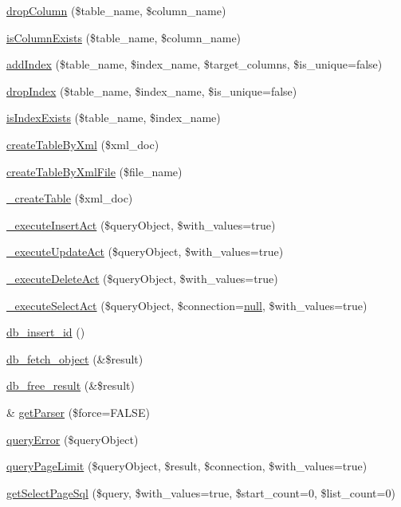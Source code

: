 \begin{DoxyCompactItemize}
\item 
\hyperlink{classDBMysql_aa4cd80d663225f3cd7a539d7d7101b38}{drop\+Column} (\$table\+\_\+name, \$column\+\_\+name)
\item 
\hyperlink{classDBMysql_a537be41db3f377b088353baa7be50a13}{is\+Column\+Exists} (\$table\+\_\+name, \$column\+\_\+name)
\item 
\hyperlink{classDBMysql_ae17d30f3fd2dbbc29996acdc8c36a00f}{add\+Index} (\$table\+\_\+name, \$index\+\_\+name, \$target\+\_\+columns, \$is\+\_\+unique=false)
\item 
\hyperlink{classDBMysql_a43937761dd37fa25ef0d373446d01d90}{drop\+Index} (\$table\+\_\+name, \$index\+\_\+name, \$is\+\_\+unique=false)
\item 
\hyperlink{classDBMysql_acabd46877d9ce2131b847696b1174382}{is\+Index\+Exists} (\$table\+\_\+name, \$index\+\_\+name)
\item 
\hyperlink{classDBMysql_a8d5c199f2a7362b92c7a6ba03ebdd554}{create\+Table\+By\+Xml} (\$xml\+\_\+doc)
\item 
\hyperlink{classDBMysql_a92f43909e6ba226fc7067ddc25594a33}{create\+Table\+By\+Xml\+File} (\$file\+\_\+name)
\item 
\hyperlink{classDBMysql_a7a3edda6d00b0c7b3702283b495b0a5d}{\+\_\+create\+Table} (\$xml\+\_\+doc)
\item 
\hyperlink{classDBMysql_a29a81acddeeaff54b404dec8377b2d2b}{\+\_\+execute\+Insert\+Act} (\$query\+Object, \$with\+\_\+values=true)
\item 
\hyperlink{classDBMysql_a93657e31e6a8f311aa76668602529e10}{\+\_\+execute\+Update\+Act} (\$query\+Object, \$with\+\_\+values=true)
\item 
\hyperlink{classDBMysql_aa1f3d836a8da807793983ff3f48998da}{\+\_\+execute\+Delete\+Act} (\$query\+Object, \$with\+\_\+values=true)
\item 
\hyperlink{classDBMysql_a2643d9c9b3e5d5286e956ea6fc883cc9}{\+\_\+execute\+Select\+Act} (\$query\+Object, \$connection=\hyperlink{modernizr_8min_8js_a286f9ec831c5e676eeb493248eab9575}{null}, \$with\+\_\+values=true)
\item 
\hyperlink{classDBMysql_a21acddd922e39574922f60b881add658}{db\+\_\+insert\+\_\+id} ()
\item 
\hyperlink{classDBMysql_a117189e72a44d1c3b615f133f486cf69}{db\+\_\+fetch\+\_\+object} (\&\$result)
\item 
\hyperlink{classDBMysql_a0d907e935bcfafa845fd39640dcc60cf}{db\+\_\+free\+\_\+result} (\&\$result)
\item 
\& \hyperlink{classDBMysql_a2e45aa07bdecbaa156452f43381d34e3}{get\+Parser} (\$force=F\+A\+L\+SE)
\item 
\hyperlink{classDBMysql_a74f602cacc17d3402cde22eccdc8b46a}{query\+Error} (\$query\+Object)
\item 
\hyperlink{classDBMysql_a0ea7c0aff43dcd69c1e4d900625c9321}{query\+Page\+Limit} (\$query\+Object, \$result, \$connection, \$with\+\_\+values=true)
\item 
\hyperlink{classDBMysql_ad7da6d2017d3a4f2e101b47b3f9b206d}{get\+Select\+Page\+Sql} (\$query, \$with\+\_\+values=true, \$start\+\_\+count=0, \$list\+\_\+count=0)
\end{DoxyCompactItemize}
